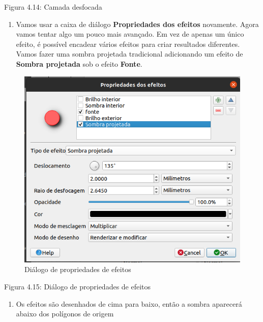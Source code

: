 \documentclass[
  portuguese,
]{krantz}
\providecommand{\tightlist}{%
  \setlength{\itemsep}{0pt}\setlength{\parskip}{0pt}}
\begin{document}
Figura 4.14: Camada desfocada

\begin{enumerate}
\def\labelenumi{\arabic{enumi}.}
\setcounter{enumi}{5}
\tightlist
\item
  Vamos usar a caixa de diálogo \textbf{Propriedades dos efeitos} novamente. Agora vamos tentar algo um pouco mais avançado. Em vez de apenas um único efeito, é possível encadear vários efeitos para criar resultados diferentes. Vamos fazer uma sombra projetada tradicional adicionando um efeito de \textbf{Sombra projetada} sob o efeito \textbf{Fonte}.
\end{enumerate}

\begin{figure}
\centering
\includegraphics{media/modulo4/drop-shadow.png}
\caption{Diálogo de propriedades de efeitos}
\end{figure}

Figura 4.15: Diálogo de propriedades de efeitos

\begin{enumerate}
\def\labelenumi{\arabic{enumi}.}
\setcounter{enumi}{6}
\tightlist
\item
  Os efeitos são desenhados de cima para baixo, então a sombra aparecerá abaixo dos polígonos de origem
\end{enumerate}
\end{document}
